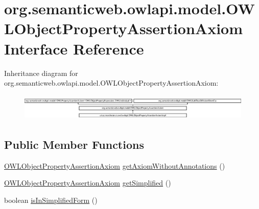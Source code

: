 \hypertarget{interfaceorg_1_1semanticweb_1_1owlapi_1_1model_1_1_o_w_l_object_property_assertion_axiom}{\section{org.\-semanticweb.\-owlapi.\-model.\-O\-W\-L\-Object\-Property\-Assertion\-Axiom Interface Reference}
\label{interfaceorg_1_1semanticweb_1_1owlapi_1_1model_1_1_o_w_l_object_property_assertion_axiom}
}
Inheritance diagram for org.\-semanticweb.\-owlapi.\-model.\-O\-W\-L\-Object\-Property\-Assertion\-Axiom\-:\begin{figure}[H]
\begin{center}
\leavevmode
\includegraphics[height=1.274658cm]{interfaceorg_1_1semanticweb_1_1owlapi_1_1model_1_1_o_w_l_object_property_assertion_axiom}
\end{center}
\end{figure}
\subsection*{Public Member Functions}
\begin{DoxyCompactItemize}
\item 
\hyperlink{interfaceorg_1_1semanticweb_1_1owlapi_1_1model_1_1_o_w_l_object_property_assertion_axiom}{O\-W\-L\-Object\-Property\-Assertion\-Axiom} \hyperlink{interfaceorg_1_1semanticweb_1_1owlapi_1_1model_1_1_o_w_l_object_property_assertion_axiom_a61889b9778aa53ad797d0e0832739403}{get\-Axiom\-Without\-Annotations} ()
\item 
\hyperlink{interfaceorg_1_1semanticweb_1_1owlapi_1_1model_1_1_o_w_l_object_property_assertion_axiom}{O\-W\-L\-Object\-Property\-Assertion\-Axiom} \hyperlink{interfaceorg_1_1semanticweb_1_1owlapi_1_1model_1_1_o_w_l_object_property_assertion_axiom_aa00c7596b08721715985b9d8670ae40d}{get\-Simplified} ()
\item 
boolean \hyperlink{interfaceorg_1_1semanticweb_1_1owlapi_1_1model_1_1_o_w_l_object_property_assertion_axiom_ae0c3f73c4f546512acb415b3974efd77}{is\-In\-Simplified\-Form} ()
\end{DoxyCompactItemize}


